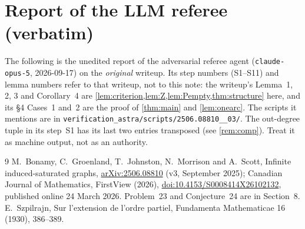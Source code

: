 \documentclass[11pt,a4paper]{article}
\theoremstyle{plain}
\theoremstyle{definition}
\theoremstyle{remark}
\begin{document}
\section{Report of the LLM referee (verbatim)}\label{app:referee}

\begin{tcolorbox}[colback=gray!8,colframe=gray!50,boxrule=0.4pt,arc=2pt]
\small The following is the unedited report of the adversarial referee agent (\texttt{claude-opus-5}, 2026-09-17) on the \emph{original} writeup. Its step numbers (S1--S11) and lemma numbers refer to that writeup, not to this note: the writeup's Lemma~1, 2, 3 and Corollary~4 are \cref{lem:criterion,lem:Z,lem:Pempty,thm:structure} here, and its \S4 Cases~1 and~2 are the proof of \cref{thm:main} and \cref{lem:onearc}. The scripts it mentions are in \texttt{verification\_astra/scripts/2506.08810\_\_03/}. The out-degree tuple in its step~S1 has its last two entries transposed (see \cref{rem:comp}). Treat it as machine output, not as an authority.
\end{tcolorbox}

{\setlength{\emergencystretch}{3em}\par}

\begin{thebibliography}{9}
\small
\setlength{\itemsep}{2pt}
 M.~Bonamy, C.~Groenland, T.~Johnston, N.~Morrison and A.~Scott, Infinite induced-saturated graphs, \href{https://arxiv.org/abs/2506.08810}{arXiv:2506.08810} (v3, September 2025); Canadian Journal of Mathematics, FirstView (2026), \href{https://doi.org/10.4153/S0008414X26102132}{doi:10.4153/S0008414X26102132}, published online 24 March 2026. Problem~23 and Conjecture~24 are in Section~8.
 E.~Szpilrajn, Sur l'extension de l'ordre partiel, Fundamenta Mathematicae 16 (1930), 386--389.
\end{thebibliography}
\end{document}
